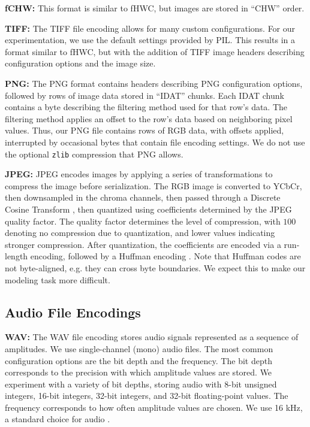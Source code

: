 \textbf{fCHW:} This format is similar to fHWC, but images are stored in ``CHW'' order.

\textbf{TIFF:} The TIFF file encoding \cite{tiff} allows for many custom configurations. For our experimentation, we use the default settings provided by PIL. This results in a format similar to fHWC, but with the addition of TIFF image headers describing configuration options and the image size.

\textbf{PNG:} The PNG format \cite{png} contains headers describing PNG configuration options, followed by rows of image data stored in ``IDAT'' chunks. Each IDAT chunk contains a byte describing the filtering method used for that row's data. The filtering method applies an offset to the row's data based on neighboring pixel values. Thus, our PNG file contains rows of RGB data, with offsets applied, interrupted by occasional bytes that contain file encoding settings. We do not use the optional {\tt zlib} compression that PNG allows.

\textbf{JPEG:}
JPEG \cite{jpeg} encodes images by applying a series of transformations to compress the image before serialization. The RGB image is converted to YCbCr, then downsampled in the chroma channels, then passed through a Discrete Cosine Transform \cite{dct}, then quantized using coefficients determined by the JPEG quality factor. The quality factor determines the level of compression, with $100$ denoting no compression due to quantization, and lower values indicating stronger compression. After quantization, the coefficients are encoded via a run-length encoding, followed by a Huffman encoding \cite{huffman-encoding}. Note that Huffman codes are not byte-aligned, e.g. they can cross byte boundaries. We expect this to make our modeling task more difficult.

\subsection{Audio File Encodings} \label{sec:audio-encodings}
\textbf{WAV:} The WAV file encoding \cite{wav} stores audio signals represented as a sequence of amplitudes. We use single-channel (mono) audio files. The most common configuration options are the bit depth and the frequency. The bit depth corresponds to the precision with which amplitude values are stored. We experiment with a variety of bit depths, storing audio with 8-bit unsigned integers, 16-bit integers, 32-bit integers, and 32-bit floating-point values. The frequency corresponds to how often amplitude values are chosen. We use 16 kHz, a standard choice for audio \cite{speechcommands}.

